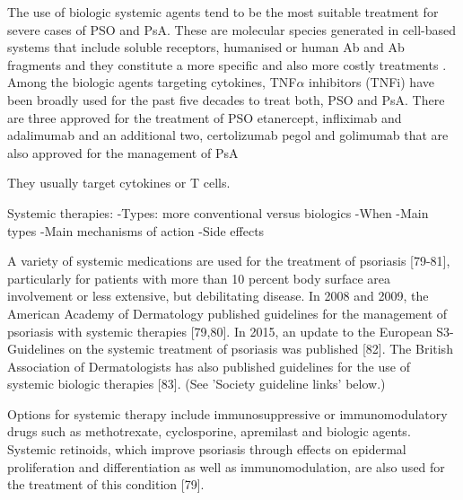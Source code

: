 The use of biologic systemic agents tend to be the most suitable treatment for severe cases of PSO and PsA. These are molecular species generated in cell-based systems that include soluble receptors, humanised or human Ab and Ab fragments and they constitute a more specific  and also more costly treatments \parencite{Perera2012}. Among the biologic agents targeting cytokines, TNF$\alpha$ inhibitors (TNFi) have been broadly used for the past five decades to treat both, PSO and PsA. There are three approved for the treatment of PSO etanercept, infliximab and adalimumab \parencite{Ahil2016} and an additional two, certolizumab pegol and golimumab that are also approved for the management of PsA \parencite{Coates2016}


They usually target cytokines or T cells. 






Systemic therapies:
-Types: more conventional versus biologics
-When
-Main types
-Main mechanisms of action
-Side effects


A variety of systemic medications are used for the treatment of psoriasis [79-81], particularly for patients with more than 10 percent body surface area involvement or less extensive, but debilitating disease. In 2008 and 2009, the American Academy of Dermatology published guidelines for the management of psoriasis with systemic therapies [79,80]. In 2015, an update to the European S3-Guidelines on the systemic treatment of psoriasis was published [82]. The British Association of Dermatologists has also published guidelines for the use of systemic biologic therapies [83]. (See 'Society guideline links' below.)

Options for systemic therapy include immunosuppressive or immunomodulatory drugs such as methotrexate, cyclosporine, apremilast and biologic agents. Systemic retinoids, which improve psoriasis through effects on epidermal proliferation and differentiation as well as immunomodulation, are also used for the treatment of this condition [79].

